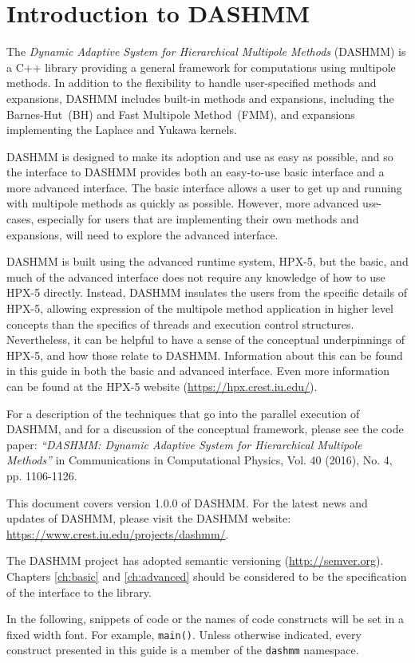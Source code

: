 \chapter{Introduction to DASHMM}
\label{ch:intro}

The {\it Dynamic Adaptive System for Hierarchical Multipole Methods}
(DASHMM) is a C++ library providing a general framework for
computations using multipole methods. In addition to the flexibility
to handle user-specified methods and expansions, DASHMM includes
built-in methods and expansions, including the Barnes-Hut~(BH) and
Fast Multipole Method~(FMM), and expansions implementing the Laplace
and Yukawa kernels.

DASHMM is designed to make its adoption and use as easy as possible,
and so the interface to DASHMM provides both an easy-to-use basic
interface and a more advanced interface. The basic interface allows a
user to get up and running with multipole methods as quickly as
possible. However, more advanced use-cases, especially for users that
are implementing their own methods and expansions, will need to
explore the advanced interface.

DASHMM is built using the advanced runtime system, HPX-5, but the
basic, and much of the advanced interface does not require any
knowledge of how to use HPX-5 directly. Instead, DASHMM insulates the
users from the specific details of HPX-5, allowing expression of the
multipole method application in higher level concepts than the
specifics of threads and execution control structures. Nevertheless,
it can be helpful to have a sense of the conceptual underpinnings of
HPX-5, and how those relate to DASHMM. Information about this can be
found in this guide in both the basic and advanced interface. Even
more information can be found at the HPX-5 website
(\url{https://hpx.crest.iu.edu/}).

For a description of the techniques that go into the parallel
execution of DASHMM, and for a discussion of the conceptual framework,
please see the code paper: {\it ``DASHMM: Dynamic Adaptive System for
  Hierarchical Multipole Methods''} in Communications in Computational
Physics, Vol. 40 (2016), No. 4, pp. 1106-1126.

This document covers version 1.0.0 of DASHMM. For the latest news and
updates of DASHMM, please visit the DASHMM website:
\url{https://www.crest.iu.edu/projects/dashmm/}.

The DASHMM project has adopted semantic versioning (\url{http://semver.org}).
Chapters \ref{ch:basic} and \ref{ch:advanced} should be considered to be the
specification of the interface to the library.

In the following, snippets of code or the names of code constructs
will be set in a fixed width font. For example, {\tt main()}. Unless
otherwise indicated, every construct presented in this guide is a
member of the {\tt dashmm} namespace.